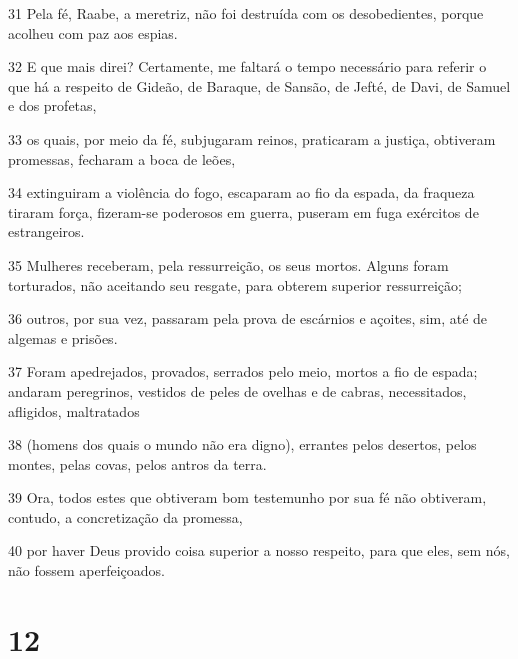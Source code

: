 \par 31 Pela fé, Raabe, a meretriz, não foi destruída com os desobedientes, porque acolheu com paz aos espias.
\par 32 E que mais direi? Certamente, me faltará o tempo necessário para referir o que há a respeito de Gideão, de Baraque, de Sansão, de Jefté, de Davi, de Samuel e dos profetas,
\par 33 os quais, por meio da fé, subjugaram reinos, praticaram a justiça, obtiveram promessas, fecharam a boca de leões,
\par 34 extinguiram a violência do fogo, escaparam ao fio da espada, da fraqueza tiraram força, fizeram-se poderosos em guerra, puseram em fuga exércitos de estrangeiros.
\par 35 Mulheres receberam, pela ressurreição, os seus mortos. Alguns foram torturados, não aceitando seu resgate, para obterem superior ressurreição;
\par 36 outros, por sua vez, passaram pela prova de escárnios e açoites, sim, até de algemas e prisões.
\par 37 Foram apedrejados, provados, serrados pelo meio, mortos a fio de espada; andaram peregrinos, vestidos de peles de ovelhas e de cabras, necessitados, afligidos, maltratados
\par 38 (homens dos quais o mundo não era digno), errantes pelos desertos, pelos montes, pelas covas, pelos antros da terra.
\par 39 Ora, todos estes que obtiveram bom testemunho por sua fé não obtiveram, contudo, a concretização da promessa,
\par 40 por haver Deus provido coisa superior a nosso respeito, para que eles, sem nós, não fossem aperfeiçoados.

\chapter{12}

